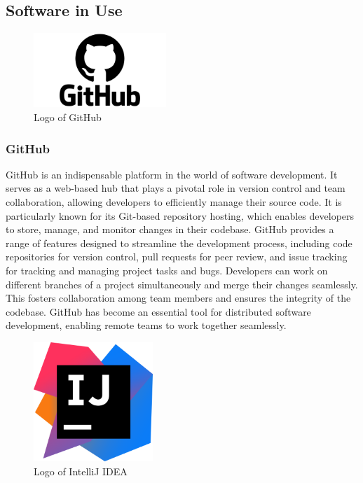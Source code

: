\documentclass[conference]{IEEEtran}
\begin{document}
    \newpage
    \subsection{Software in Use}
    
        \begin{figure}[htbp]
        \centerline{\includegraphics[width=5cm]{Images/logo/github.png}}
        \label{fig}
        \caption{Logo of GitHub}
        \end{figure}
        \subsubsection{GitHub}
        GitHub is an indispensable platform in the world of software development. It serves as a web-based hub that plays a pivotal role in version control and team collaboration, allowing developers to efficiently manage their source code. It is particularly known for its Git-based repository hosting, which enables developers to store, manage, and monitor changes in their codebase. GitHub provides a range of features designed to streamline the development process, including code repositories for version control, pull requests for peer review, and issue tracking for tracking and managing project tasks and bugs. Developers can work on different branches of a project simultaneously and merge their changes seamlessly. This fosters collaboration among team members and ensures the integrity of the codebase. GitHub has become an essential tool for distributed software development, enabling remote teams to work together seamlessly.\\
        
        \begin{figure}[htbp]
        \centerline{\includegraphics[width = 4.5cm]{Images/logo/intellij.png}}
        \label{fig}
        \caption{Logo of IntelliJ IDEA}
        \end{figure}
\end{document}

